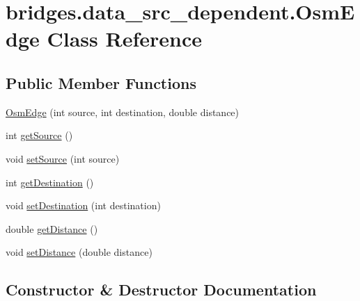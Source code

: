 \hypertarget{classbridges_1_1data__src__dependent_1_1_osm_edge}{}\section{bridges.\+data\+\_\+src\+\_\+dependent.\+Osm\+Edge Class Reference}
\label{classbridges_1_1data__src__dependent_1_1_osm_edge}
\subsection*{Public Member Functions}
\begin{DoxyCompactItemize}
\item 
\mbox{\hyperlink{classbridges_1_1data__src__dependent_1_1_osm_edge_a87b1d4efb3d94d8109b18f29882475f6}{Osm\+Edge}} (int source, int destination, double distance)
\item 
int \mbox{\hyperlink{classbridges_1_1data__src__dependent_1_1_osm_edge_a4ffc915a30144db8e3c1521772a6a26d}{get\+Source}} ()
\item 
void \mbox{\hyperlink{classbridges_1_1data__src__dependent_1_1_osm_edge_aa61fb02ce746b89c26c71cd2f20053e7}{set\+Source}} (int source)
\item 
int \mbox{\hyperlink{classbridges_1_1data__src__dependent_1_1_osm_edge_a9695950217254c113eada4019d647977}{get\+Destination}} ()
\item 
void \mbox{\hyperlink{classbridges_1_1data__src__dependent_1_1_osm_edge_a0bfcd0bd6dc7a4e97a078a67e41df445}{set\+Destination}} (int destination)
\item 
double \mbox{\hyperlink{classbridges_1_1data__src__dependent_1_1_osm_edge_a0bad934b9b643d5d0e375eb4210601a5}{get\+Distance}} ()
\item 
void \mbox{\hyperlink{classbridges_1_1data__src__dependent_1_1_osm_edge_afe9d2fa452c89d08d7c1a23ff3302c62}{set\+Distance}} (double distance)
\end{DoxyCompactItemize}


\subsection{Constructor \& Destructor Documentation}
\mbox{\label{classbridges_1_1data__src__dependent_1_1_osm_edge_a87b1d4efb3d94d8109b18f29882475f6}} 
